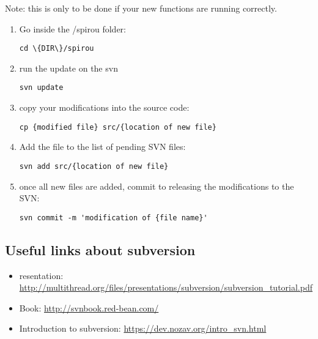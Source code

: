 Note: this is only to be done if your new functions are running correctly.

\begin{enumerate}
\item Go inside the /spirou folder:
\begin{lstlisting}[style=bashstyle]
cd \{DIR\}/spirou
\end{lstlisting}

\item run the update on the svn
\begin{lstlisting}[style=bashstyle]
svn update
\end{lstlisting}

\item copy your modifications into the source code:
\begin{lstlisting}[style=bashstyle]
cp {modified file} src/{location of new file}
\end{lstlisting}

\item Add the file to the list of pending SVN files:
\begin{lstlisting}[style=bashstyle]
svn add src/{location of new file}
\end{lstlisting}

\item once all new files are added, commit to releasing the modifications to the SVN:
\begin{lstlisting}[style=bashstyle]
svn commit -m 'modification of {file name}'
\end{lstlisting}

\end{enumerate}

\subsection{Useful links about subversion}
\label{section:useful-links}

\begin{itemize}
\item resentation: \url{http://multithread.org/files/presentations/subversion/subversion_tutorial.pdf}
\item Book: \url{http://svnbook.red-bean.com/}
\item Introduction to subversion: \url{https://dev.nozav.org/intro_svn.html}
\end{itemize}